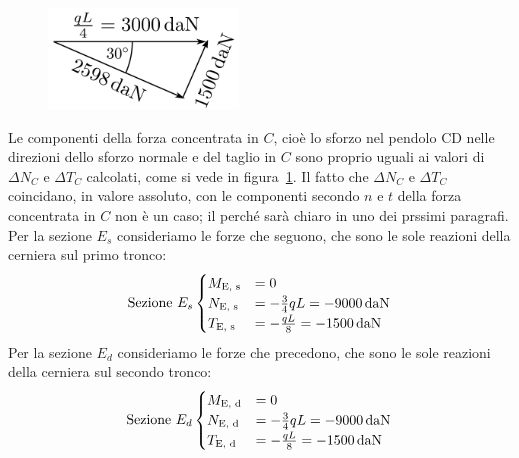 \begin{figure}[ht]
\centering
\includegraphics[width=0.45\textwidth]{Immagini/Parte_11/Esercizio11_1_1/esercizio11_1_5.pdf}
\caption{}
\label{Esercizio11-1-5}
\end{figure}
Le componenti della forza concentrata in $C$, cioè lo sforzo nel pendolo $\text{CD}$ nelle direzioni dello sforzo normale e del taglio in $C$ sono proprio uguali ai valori di $\Delta N_{C}$ e $\Delta T_{C}$ calcolati, come si vede in figura~\ref{Esercizio11-1-5}. Il fatto che $\Delta N_{C}$ e $\Delta T_{C}$ coincidano, in valore assoluto, con le componenti secondo $n$ e $t$ della forza concentrata in $C$ non è un caso; il perché sarà chiaro in uno dei prssimi paragrafi. Per la sezione $E_s$ consideriamo le forze che seguono, che sono le sole reazioni della cerniera sul primo tronco:
\begin{equation*}
\text{Sezione } E_{s} 
\begin{cases}
M_{\textup{E, s}} &=  0 \\
N_{\textup{E, s}} &=  - \frac{3}{4}qL = -\SI{9000}{daN} \\
T_{\textup{E, s}} & = -\frac{qL}{8} = -\SI{1500}{daN}
\end{cases}
\end{equation*}
Per la sezione $E_d$ consideriamo le forze che precedono, che sono le sole reazioni della cerniera sul secondo tronco:
\begin{equation*}
\text{Sezione } E_{d} 
\begin{cases}
M_{\textup{E, d}} &=  0 \\
N_{\textup{E, d}} &=  - \frac{3}{4}qL = -\SI{9000}{daN} \\
T_{\textup{E, d}} & = -\frac{qL}{8} = -\SI{1500}{daN}
\end{cases}
\end{equation*}
